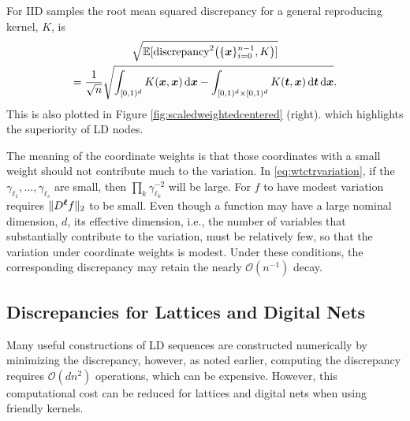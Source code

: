 \documentclass{svproc}
\begin{document}
For IID samples the root mean squared discrepancy for a general reproducing kernel, $K$, is
\begin{multline} \label{eq:discIID}
    \sqrt{\mathbb{E}[\text{discrepancy}^2\bigl(\{{\boldsymbol{x}}\}_{i=0}^{n-1},K \bigr)] } \\
    = \frac 1{\sqrt{n}}  \sqrt{  \int_{[0,1)^d} K({\boldsymbol{x}},{\boldsymbol{x}}) \, \mathrm{d} {\boldsymbol{x}} -
	 \int_{[0,1)^d \times [0,1)^d} K({\boldsymbol{t}},{\boldsymbol{x}}) \, \mathrm{d} {\boldsymbol{t}} \, \mathrm{d} {\boldsymbol{x}}}.
\end{multline}
This is also plotted in Figure \ref{fig:scaledweightedcentered} (right). which highlights the superiority of LD nodes.

The meaning of the coordinate weights is that those coordinates with a small weight should not contribute much to the variation.  In \eqref{eq:wtctrvariation}, if the $\gamma_{\ell_1}, \ldots, \gamma_{\ell_s}$ are small, then $\prod_k \gamma_{\ell_k}^{-2}$ will be large.  For $f$ to have modest variation requires $\lVert D^{{\boldsymbol{\ell}}}f \rVert_2$ to be small.  Even though a function may have a large nominal dimension, $d$, its effective dimension, i.e., the number of variables that substantially contribute to the variation, must be relatively few, so that the variation under coordinate weights is modest.  Under these conditions, the corresponding discrepancy may retain the nearly $\mathcal{O}(n^{-1})$ decay.

\subsection{Discrepancies for Lattices and Digital Nets} \label{sec:latticenetdis}
Many useful constructions of LD sequences are constructed numerically by minimizing the discrepancy, however, as noted earlier, computing the discrepancy requires $\mathcal{O}(dn^2)$ operations, which can be expensive.  However, this computational cost can be reduced for lattices and digital nets when using friendly kernels.
\end{document}
